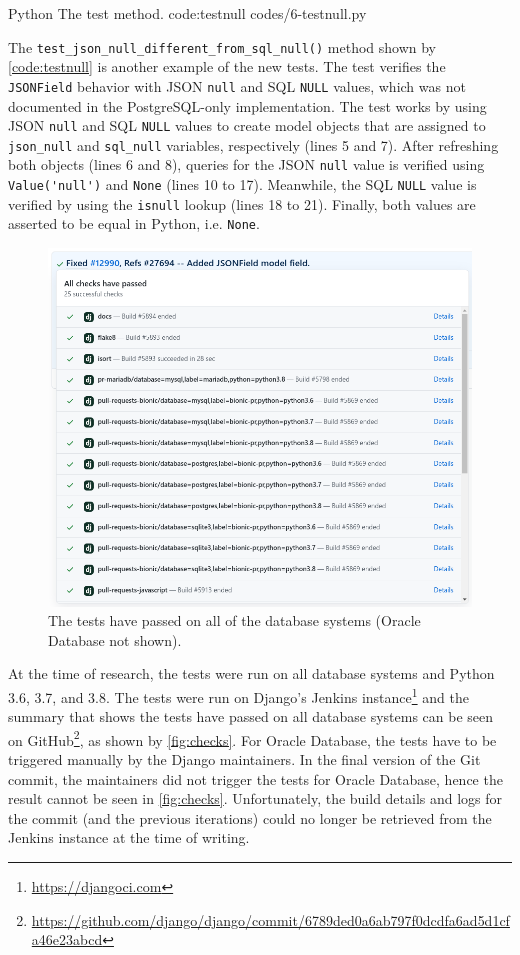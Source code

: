 \listing
{Python}
{The  test method.}
{code:testnull}
{codes/6-testnull.py}

The \verb|test_json_null_different_from_sql_null()| method shown by
\autoref{code:testnull} is another example of the new tests. The test verifies
the \verb|JSONField| behavior with JSON \verb|null| and SQL \verb|NULL| values,
which was not documented in the PostgreSQL-only implementation. The test works
by using JSON \verb|null| and SQL \verb|NULL| values to create model objects
that are assigned to \verb|json_null| and \verb|sql_null| variables,
respectively (lines 5 and 7). After refreshing both objects (lines 6 and 8),
queries for the JSON \verb|null| value is verified using \verb|Value('null')|
and \verb|None| (lines 10 to 17). Meanwhile, the SQL \verb|NULL| value is
verified by using the \verb|isnull| lookup (lines 18 to 21). Finally, both
values are asserted to be equal in Python, i.e. \verb|None|.

\begin{figure}
	\centering
    \includegraphics[width=1.00\textwidth]{pics/github-checks.png}
	\caption{The tests have passed on all of the database systems
	(Oracle Database not shown).}
	\label{fig:checks}
\end{figure}

At the time of research, the tests were run on all database systems and Python
3.6, 3.7, and 3.8. The tests were run on Django's Jenkins
instance\footnote{\url{https://djangoci.com}} and the summary that shows the
tests have passed on all database systems can be seen on
GitHub\footnote{\url{https://github.com/django/django/commit/6789ded0a6ab797f0dcdfa6ad5d1cfa46e23abcd}},
as shown by \autoref{fig:checks}. For Oracle Database, the tests have to be
triggered manually by the Django maintainers. In the final version of the Git
commit, the maintainers did not trigger the tests for Oracle Database, hence
the result cannot be seen in \autoref{fig:checks}. Unfortunately, the build
details and logs for the commit (and the previous iterations) could no longer
be retrieved from the Jenkins instance at the time of writing.

